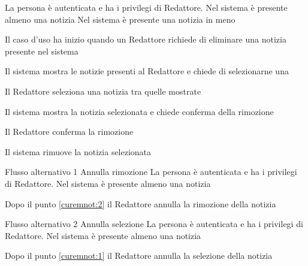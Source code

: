 {}
{La persona è autenticata e ha i privilegi di Redattore. Nel sistema è presente almeno una notizia}
{Nel sistema è presente una notizia in meno}
{\begin{enumCU}
	\item Il caso d'uso ha inizio quando un Redattore richiede di eliminare una notizia presente nel sistema
	\item Il sistema mostra le notizie presenti al Redattore e chiede di selezionarne una \label{curemnot:1}
	\item Il Redattore seleziona una notizia tra quelle mostrate
	\item Il sistema mostra la notizia selezionata e chiede conferma della rimozione \label{curemnot:2}
	\item Il Redattore conferma la rimozione
	\item Il sistema rimuove la notizia selezionata
\end{enumCU}}
%
{Flusso alternativo 1}%
{Annulla rimozione}%
{La persona è autenticata e ha i privilegi di Redattore. Nel sistema è presente almeno una notizia}%
{\postNulle}%
{\begin{enumCU}
		\item Dopo il punto \ref{curemnot:2} il Redattore annulla la rimozione della notizia
	\end{enumCU}}%
%
{Flusso alternativo 2}%
{Annulla selezione}%
{La persona è autenticata e ha i privilegi di Redattore. Nel sistema è presente almeno una notizia}%
{\postNulle}%
{\begin{enumCU}
		\item Dopo il punto \ref{curemnot:1} il Redattore annulla la selezione della notizia
\end{enumCU}}%

